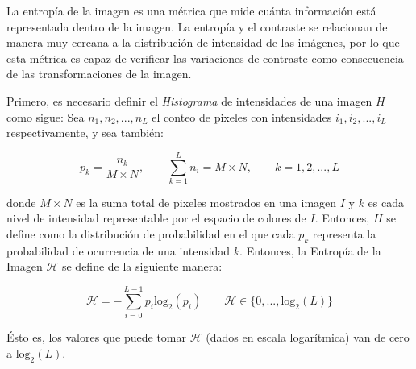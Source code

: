 La entropía de la imagen \cite{108593} es una métrica que mide cuánta información está representada dentro de la imagen. La entropía y el contraste se relacionan de manera muy cercana a la distribución de intensidad de las imágenes, por lo que esta métrica es capaz de verificar las variaciones de contraste como consecuencia de las transformaciones de la imagen.


Primero, es necesario definir el \textit{Histograma} de intensidades de una imagen $H$ como sigue: Sea $n_1, n_2, ..., n_{L}$ el conteo de pixeles con intensidades $i_1, i_2, ..., i_{L}$ respectivamente, y sea también:


\begin{equation}
p_k=\frac{n_k}{M \times N}, \qquad \sum_{k=1}^L n_i = {M \times N}, \qquad k= 1,2,...,L
\end{equation}

donde $M \times N$ es la suma total de pixeles mostrados en una imagen $I$ y $k$ es cada nivel de intensidad representable por el espacio de colores de $I$. Entonces, $H$ se define como la distribución de probabilidad en el que cada $p_k$ representa la probabilidad de ocurrencia de una intensidad $k$. Entonces, la Entropía de la Imagen $\mathscr{H}$ se define de la siguiente manera:


\begin{equation}
\mathscr{H}\label{symbol:entropia}= -\sum_{i=0}^{L-1} p_i \text{log}_2(p_i) \qquad \mathscr{H} \in \{0,...,\text{log}_2(L)\}
\end{equation}

Ésto es, los valores que puede tomar $\mathscr{H}$ (dados en escala logarítmica) van de cero a $\text{log}_2(L)$.

